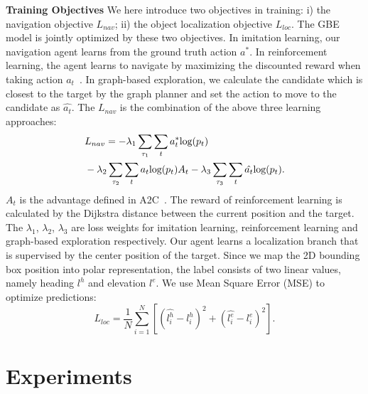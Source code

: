 \documentclass[final]{cvpr}
\begin{document}
\noindent\textbf{Training Objectives} We here introduce two objectives in training: i) the navigation objective $L_{nav}$; ii) the object localization objective $L_{loc}$. The GBE model is jointly optimized by these two objectives. 
In imitation learning, our navigation agent learns from the ground truth action $a^*$. 
In reinforcement learning, the agent learns to navigate by maximizing the discounted reward when taking action $a_t$~\cite{sutton1999policy}. 
In graph-based exploration, we calculate the candidate which is closest to the target by the graph planner and set the action to move to the candidate as $\hat{a_t}$. 
The $L_{nav}$ is the combination of the above three learning approaches: 
\begin{equation}
\begin{split}
& L_{nav} =  - \lambda_{1} \sum_{\tau_1} \sum_t a_t^* \textnormal{log}(p_t) \\
& - \lambda_{2} \sum_{\tau_2} \sum_t a_t \textnormal{log}(p_t) A_t 
 - \lambda_{3} \sum_{\tau_3} \sum_t \hat{a_t} \textnormal{log}(p_t). 
\end{split}
\end{equation}
$A_t$ is the advantage defined in A2C~\cite{mnih2016asynchronous}. The reward of reinforcement learning is calculated by the Dijkstra distance between the current position and the target. 
The $\lambda_1$, $\lambda_2$, $\lambda_3$ are loss weights for imitation learning, reinforcement learning and graph-based exploration respectively. 
Our agent learns a localization branch that is supervised by the center position of the target. Since we map the 2D bounding box position into polar representation, the label consists of two linear values, namely heading $l^h$ and elevation $l^e$. We use Mean Square Error (MSE) to optimize predictions: 
\begin{equation}
L_{loc} = \frac{1}{N} \sum_{i=1}^{N} \left [ (\hat{l^h_i} - l^h_i)^2 + (\hat{l^e_i} - l^e_i)^2 \right ].
\end{equation}
\section{Experiments}
\end{document}
